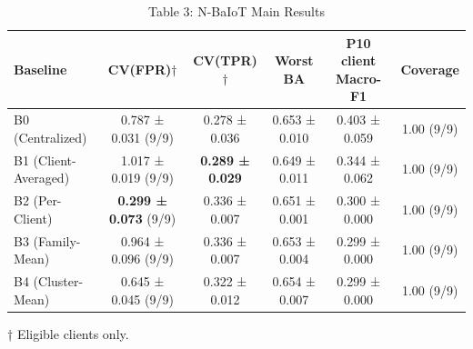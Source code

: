\begin{table}[htbp]
\caption{Table 3: N-BaIoT Main Results}
\centering
\begin{tabular}{l c c c c c}
\toprule
Baseline & CV(FPR)$\dagger$ & CV(TPR)$\dagger$ & Worst BA & P10 client Macro-F1 & Coverage \\
\midrule
B0 (Centralized) & 0.787 ± 0.031 (9/9) & 0.278 ± 0.036 & 0.653 ± 0.010 & 0.403 ± 0.059 & 1.00 (9/9) \\
B1 (Client-Averaged) & 1.017 ± 0.019 (9/9) & \textbf{0.289 ± 0.029} & 0.649 ± 0.011 & 0.344 ± 0.062 & 1.00 (9/9) \\
B2 (Per-Client) & \textbf{0.299 ± 0.073} (9/9) & 0.336 ± 0.007 & 0.651 ± 0.001 & 0.300 ± 0.000 & 1.00 (9/9) \\
B3 (Family-Mean) & 0.964 ± 0.096 (9/9) & 0.336 ± 0.007 & 0.653 ± 0.004 & 0.299 ± 0.000 & 1.00 (9/9) \\
B4 (Cluster-Mean) & 0.645 ± 0.045 (9/9) & 0.322 ± 0.012 & 0.654 ± 0.007 & 0.299 ± 0.000 & 1.00 (9/9) \\
\bottomrule
\end{tabular}

\footnotesize{† Eligible clients only.}

\end{table}